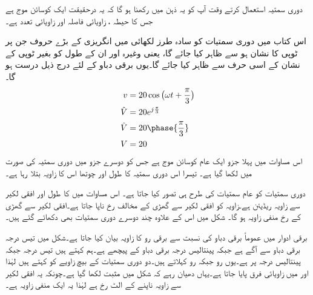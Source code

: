 دوری سمتیہ استعمال کرتے وقت آپ کو یہ ذہن میں رکھنا ہو گا کہ یہ درحقیقت ایک کوسائن موج ہے جس کا حیطہ   ، زاویائی فاصلہ   اور زاویائی تعدد  ہے۔

اس کتاب میں دوری سمتیات کو سادہ طرز لکھائی میں انگریزی کے بڑے حروف جن پر ٹوپی کا نشان ہو سے ظاہر کیا جائے گا، یعنی   وغیرہ اور ان کے طول کو بغیر ٹوپی کے نشان کے اسی حرف سے ظاہر کیا جائے گا۔یوں برقی دباو  کے لئے درج ذیل درست ہو گا۔
\begin{gather}
\begin{aligned}
v&=20 \cos \big(\omega t +\frac{\pi}{3}\big)\\
\hat{V}&=20 e^{j \frac{\pi}{3}}\\
\hat{V}&=20 \phase{\frac{\pi}{3}}\\
V&=20
\end{aligned}
\end{gather}
اس مساوات میں پہلا جزو ایک عام کوسائن موج ہے جس کو دوسرے جزو میں دوری سمتیہ کی صورت میں لکھا گیا ہے۔ تیسرا اس دوری سمتیہ کا طول اور چوتھا اس کا زاویہ بتلا رہا ہے۔

دوری سمتیات کو عام سمتیات کی طرح ہی تصور کیا جاتا ہے۔ اس مساوات میں  کا طول  اور افقی لکیر سے زاویہ   ریڈیئن ہے۔زاویہ  کو افقی لکیر سے گھڑی کے مخالف رخ ناپا جاتا ہے۔افقی لکیر سے گھڑی کے رخ  منفی زاویہ ہو گا۔ شکل  میں اس  کے علاوہ چند دوسرے  دوری سمتیات بھی  دکھائے گئے ہیں۔

برقی ادوار میں عموماً برقی دباو  کی نسبت سے  برقی رو   کا زاویہ بیان کیا جاتا ہے۔شکل    میں  تیس درجہ برقی دباو سے آگے ہے جبکہ    پینتالیس درجہ  برقی دباو کے  پیچھے  ہے۔ہم کہتے ہیں  تیس درجہ    جبکہ   پینتالیس درجہ   پر ہے۔یوں     رو جبکہ     رو کہلاتے ہیں۔دو دوری سمتیات کے بیچ زاویے کو  کہتے ہیں لہٰذا  اور  میں   زاویائی فرق پایا جاتا ہے۔یہاں  دھیان رہے کہ شکل  میں   مثبت لکھا گیا ہے۔چونکہ یہ افقی لکیر سے زاویہ ناپنے کے الٹ رخ ہے لہٰذا یہ ایک منفی زاویہ ہے۔

